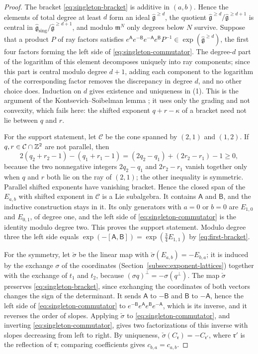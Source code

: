 \begin{proof}
The bracket \eqref{eq:singleton-bracket} is additive in $(a,b)$.  Hence the
elements of total degree at least $d$ form an ideal
$\widehat{\mathfrak g}^{\geq d}$, the quotient
$\widehat{\mathfrak g}^{\geq d}/\widehat{\mathfrak g}^{\geq d+1}$ is central
in $\widehat{\mathfrak g}_{\mathrm{sing}}/\widehat{\mathfrak g}^{\geq d+1}$,
and modulo $\mathfrak m^N$ only degrees below $N$ survive.  Suppose that a
product $P$ of ray factors satisfies
$e^{\mathsf A}e^{-\mathsf B}e^{-\mathsf A}e^{\mathsf B}P^{-1}
\in\exp(\widehat{\mathfrak g}^{\geq d})$, the first four factors forming the
left side of \eqref{eq:singleton-commutator}.  The degree-$d$ part of the
logarithm of this element decomposes uniquely into ray components; since this
part is central modulo degree $d+1$, adding each component to the
logarithm of the corresponding factor removes the discrepancy in degree $d$,
and no other choice does.  Induction on $d$ gives existence and uniqueness
in (1).  This is the argument of the Kontsevich--Soibelman lemma
\cite[Thm.~1.4]{grosspandharipandesiebert2010}; it uses only the grading and
not convexity, which fails here: the shifted exponent $q+r-\kappa$ of a
bracket need not lie between $q$ and $r$.

For the support statement, let $\mathcal C$ be the cone spanned by $(2,1)$
and $(1,2)$.  If $q,r\in\mathcal C\cap\mathbb Z^2$ are not parallel, then
\[
 2(q_2+r_2-1)-(q_1+r_1-1)=(2q_2-q_1)+(2r_2-r_1)-1\geq0,
\]
because the two nonnegative integers $2q_2-q_1$ and $2r_2-r_1$ vanish
together only when $q$ and $r$ both lie on the ray of $(2,1)$; the other
inequality is symmetric.  Parallel shifted exponents have vanishing bracket.
Hence the closed span of the $E_{a,b}$ with shifted exponent in $\mathcal C$
is a Lie subalgebra.  It contains $\mathsf A$ and $\mathsf B$, and the
inductive construction stays in it.  Its only generators with $a=0$ or $b=0$
are $E_{1,0}$ and $E_{0,1}$, of degree one, and the left side of
\eqref{eq:singleton-commutator} is the identity modulo degree two.  This
proves the support statement.  Modulo degree three the left side equals
$\exp(-[\mathsf A,\mathsf B])=\exp(\tfrac34E_{1,1})$ by
\eqref{eq:first-bracket}.

For the symmetry, let $\check\sigma$ be the linear map with
$\check\sigma(E_{a,b})=-E_{b,a}$; it is induced by the exchange $\sigma$ of
the coordinates (Section~\ref{subsec:exponent-lattices}) together with the
exchange of $t_1$ and $t_2$, because $(\sigma q)^\perp=-\sigma(q^\perp)$.
The map $\check\sigma$ preserves \eqref{eq:singleton-bracket}, since
exchanging the coordinates of both vectors changes the sign of the
determinant.  It sends $\mathsf A$ to $-\mathsf B$ and $\mathsf B$ to
$-\mathsf A$, hence the left side of \eqref{eq:singleton-commutator} to
$e^{-\mathsf B}e^{\mathsf A}e^{\mathsf B}e^{-\mathsf A}$, which is its
inverse, and it reverses the order of slopes.  Applying $\check\sigma$ to
\eqref{eq:singleton-commutator}, and inverting
\eqref{eq:singleton-commutator}, gives two factorizations of this inverse
with slopes decreasing from left to right.  By uniqueness,
$\check\sigma(C_{\mathfrak r})=-C_{\mathfrak r'}$, where $\mathfrak r'$ is the
reflection of $\mathfrak r$; comparing coefficients gives $c_{b,a}=c_{a,b}$.


\end{proof}
